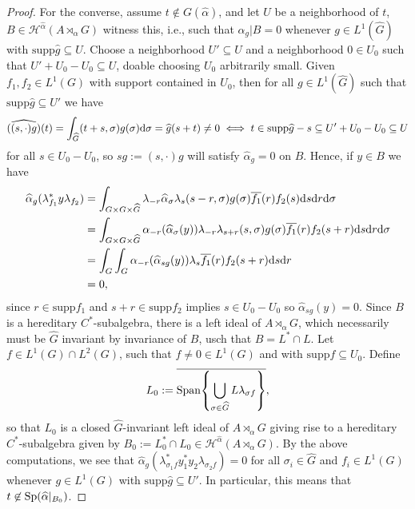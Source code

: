\begin{proof}
	For the converse, assume $t \not \in G(\hat \alpha)$, and let $U$ be a neighborhood of $t$, $B \in \mathscr{H}^{\hat \alpha}(A \rtimes_\alpha G)$  witness this, i.e., such that $\hat \alpha _g | B = 0$ whenever $g \in L^1(\hat G)$ with $\mathrm{supp} \hat g \subseteq U $. Choose a neighborhood $U' \subseteq U$ and a neighborhood $0 \in U_0$ such that $U' + U_0-U_0 \subseteq U$, doable choosing $U_0$ arbitrarily small. Given $f_1,f_2 \in L^1(G)$ with support contained in $U_0$, then for all $g \in L^1(\hat G)$ such that $\mathrm{supp} \hat g \subseteq U'$ we have
\begin{align*}
	\widehat{((s,\cdot)g)}(t) = \int_{\widehat{G}} (t+s, \sigma) g(\sigma) \mathrm{d} \sigma = \widehat{g}(s+t)  \neq 0 \iff t \in \mathrm{supp} \widehat{g} - s \subseteq U'+U_0-U_0 \subseteq U
\end{align*}
for all $s \in U_0-U_0$, so $sg := (s, \cdot) g$ will satisfy $\hat \alpha_g = 0$ on $B$. Hence, if $y \in B$ we have
\begin{align*}
	\widehat{\alpha}_g(\lambda_{f_1}^* y \lambda_{f_2}) &=  \int_{G \times G \times \widehat{G}} \lambda_{-r} \widehat{\alpha}_\sigma \lambda_s (s-r,\sigma) g(\sigma) \overline{f_1}(r) f_2(s) \mathrm{d} s \mathrm{d} r \mathrm{d} \sigma\\
	&=  \int_{G \times G \times \widehat{G}} \alpha_{-r}(\widehat{\alpha}_\sigma(y)) \lambda_{-r} \lambda_{s+r}(s,\sigma) g(\sigma) \overline{f_1}(r) f_2(s+r) \mathrm{d} s \mathrm{d} r \mathrm{d} \sigma\\
	&= \int_{G} \int_G \alpha_{-r}(\widehat{\alpha}_{sg}(y)) \lambda_s \overline{f_1}(r) f_2(s+r) \mathrm{d} s \mathrm{d} r\\
	&= 0,
\end{align*}
since $r \in \mathrm{supp} f_1$ and $s+r \in \mathrm{supp} f_2$ implies $s \in U_0-U_0$ so $\hat \alpha_{sg}(y) = 0$. Since $B$ is a hereditary $C^*$-subalgebra, there is a left ideal of $A \rtimes_\alpha G$, which necessarily must be $\hat G$ invariant by invariance of $B$, usch that $B = L^* \cap L$. Let $f \in L^1(G) \cap L^2(G)$, such that $f \neq 0 \in L^1(G)$ and with $\mathrm{supp} f \subseteq U_0$. Define
\begin{align*}
	L_0 :=	\overline{\mathrm{Span} {\left\{\bigcup_{\sigma \in \widehat{G}} L \lambda_{\sigma f}\right\}}},
\end{align*}
so that $L_0$ is a closed $\hat G$-invariant left ideal of $A \rtimes_\alpha G$ giving rise to a hereditary $C^*$-subalgebra given by $B_0:= L_0^* \cap L_0 \in \mathscr H^{\hat \alpha}(A \rtimes_{\alpha}G)$. By the above computations, we see that $\hat \alpha_g(\lambda_{\sigma_1 f}^* y_1^* y_2 \lambda_{\sigma_2 f}) = 0$ for all $\sigma_i \in \hat G$ and $f_i \in L^1(G)$ whenever $g \in L^1(G)$ with $\mathrm{supp} \hat g \subseteq U'$. In particular, this means that $t \not\in \mathrm{Sp}(\widehat{\alpha}|_{B_0})$.


\end{proof}
